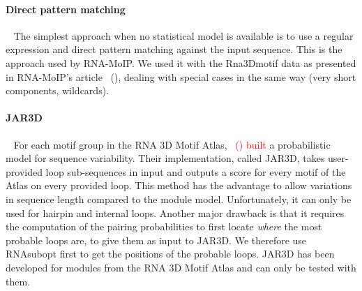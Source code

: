 \documentclass{bioinfo}
\begin{document}
\begin{methods}
\paragraph{Direct pattern matching} ~ The simplest approach when no statistical model is available is to use a regular expression and direct pattern matching against the input sequence. This is the approach used by RNA-MoIP. We used it with the Rna3Dmotif data as presented in RNA-MoIP's article ~(\citealp{reinharz_towards_2012}), dealing with special cases in the same way (very short components, wildcards).

\paragraph{JAR3D} ~ For each motif group in the RNA 3D Motif Atlas, \textcolor{red}{~(\citealp{zirbel_identifying_2015}) built} a probabilistic model for sequence variability. 
Their implementation, called JAR3D, takes user-provided loop sub-sequences in input and outputs a score for every motif of the Atlas on every provided loop. This method has the advantage to allow variations in sequence length compared to the module model. Unfortunately, it can only be used for hairpin and internal loops. Another major drawback is that it requires the computation of the pairing probabilities to first locate \textit{where} the most probable loops are, to give them as input to JAR3D. We therefore use RNAsubopt first to get the positions of the probable loops. JAR3D has been developed for modules from the RNA 3D Motif Atlas and can only be tested with them.


\end{methods}
\end{document}
